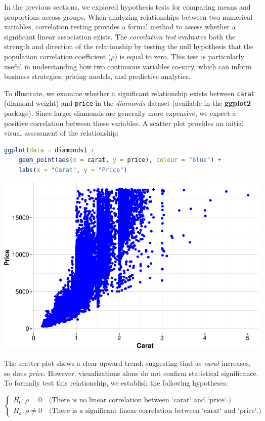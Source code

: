 \documentclass[
]{book}
\newcommand{\passthrough}[1]{#1}
\theoremstyle{definition}
\theoremstyle{definition}
\theoremstyle{definition}
\theoremstyle{definition}
\theoremstyle{remark}
\begin{document}
In the previous sections, we explored hypothesis tests for comparing means and proportions across groups. When analyzing relationships between two numerical variables, correlation testing provides a formal method to assess whether a significant linear association exists. The \emph{correlation test} evaluates both the strength and direction of the relationship by testing the null hypothesis that the population correlation coefficient (\(\rho\)) is equal to zero. This test is particularly useful in understanding how two continuous variables co-vary, which can inform business strategies, pricing models, and predictive analytics.

To illustrate, we examine whether a significant relationship exists between \passthrough{\lstinline!carat!} (diamond weight) and \passthrough{\lstinline!price!} in the \emph{diamonds} dataset (available in the \textbf{ggplot2} package). Since larger diamonds are generally more expensive, we expect a positive correlation between these variables. A scatter plot provides an initial visual assessment of the relationship:

\begin{lstlisting}[language=R]
ggplot(data = diamonds) +
    geom_point(aes(x = carat, y = price), colour = "blue") +
    labs(x = "Carat", y = "Price") 
\end{lstlisting}

\begin{center}\includegraphics[width=0.7\linewidth]{statistics_files/figure-latex/unnamed-chunk-19-1} \end{center}

The scatter plot shows a clear upward trend, suggesting that as \emph{carat} increases, so does \emph{price}. However, visualizations alone do not confirm statistical significance. To formally test this relationship, we establish the following hypotheses:

\[
\begin{cases}
    H_0: \rho   =  0 \quad \text{(There is no linear correlation between `carat` and `price`.)} \\
    H_a: \rho \neq 0 \quad \text{(There is a significant linear correlation between `carat` and `price`.)}
\end{cases}
\]
\end{document}
